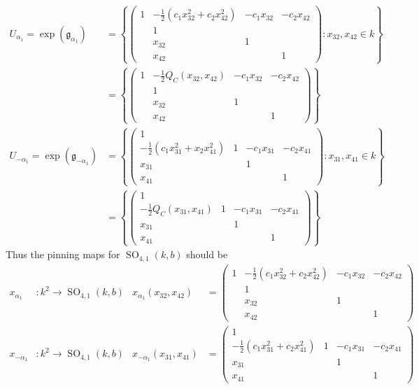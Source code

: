 \documentclass[12pt]{article}
\theoremstyle{definition}
\newcommand{\lp}{\left(}
\newcommand{\rp}{\right)}
\newcommand{\lb}{\left\{}
\newcommand{\rb}{\right\}}
\newcommand{\frakg}{\mathfrak{g}}
\DeclareMathOperator{\SO}{SO}
\begin{document}
\begin{align*}
	U_{\alpha_1} = \exp(\frakg_{\alpha_1}) &=
	\lb
	\begin{pmatrix}
		1 & - \frac 12 \lp c_1 x_{32}^2 + c_2 x_{42}^2 \rp & - c_1 x_{32}  & - c_2 x_{42} \\
		& 1 &  \\
		& x_{32} & 1 &  \\
		& x_{42} && 1
	\end{pmatrix}  
	: x_{32}, x_{42} \in k
	\rb \\
	&=
	\lb
	\begin{pmatrix}
		1 & - \frac 12  Q_C \lp x_{32}, x_{42} \rp& - c_1 x_{32}  & - c_2 x_{42} \\
		& 1 &  \\
		& x_{32} & 1 &  \\
		& x_{42} && 1
	\end{pmatrix}  
	\rb \\
	U_{-\alpha_1} = \exp(\frakg_{-\alpha_1}) &= \lb
	\begin{pmatrix}
		1  \\
		- \frac 12 \lp c_1 x_{31}^2 + x_2 x_{41}^2 \rp & 1 & - c_1 x_{31} & - c_2 x_{41} \\
		x_{31} & & 1 & \\
		x_{41} & & & 1
	\end{pmatrix}
	: x_{31}, x_{41} \in k
	\rb \\
	&= \lb
	\begin{pmatrix}
		1   \\
		- \frac 12 Q_C \lp x_{31}, x_{41} \rp & 1 & - c_1 x_{31} & - c_2 x_{41} \\
		x_{31} & & 1 & \\
		x_{41} & & & 1
	\end{pmatrix}
	\rb
\end{align*}
Thus the pinning maps for $\SO_{4,1}(k,b)$ should be
\begin{align*}
	x_{\alpha_1}& :k^2 \to \SO_{4,1}(k,b) & x_{\alpha_1}(x_{32}, x_{42}) &=
	\begin{pmatrix}
		1 & - \frac 12 \lp c_1 x_{32}^2 + c_2 x_{42}^2 \rp & - c_1 x_{32}  & - c_2 x_{42} \\
		& 1 &  \\
		& x_{32} & 1 &  \\
		& x_{42} && 1
	\end{pmatrix}  \\
	x_{-\alpha_1}&:k^2 \to \SO_{4,1}(k,b) & x_{-\alpha_1}(x_{31}, x_{41}) &=
	\begin{pmatrix}
		1 \\
		- \frac 12 \lp c_1 x_{31}^2 + c_2 x_{41}^2 \rp & 1 & - c_1 x_{31} & - c_2 x_{41} \\
		x_{31} & & 1 & \\
		x_{41} & & & 1
	\end{pmatrix}
\end{align*}
\end{document}
